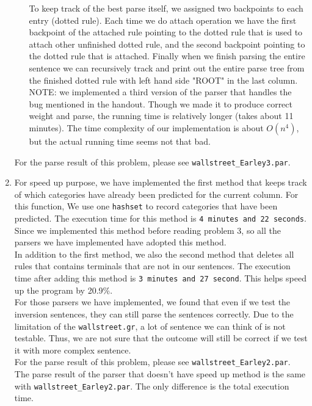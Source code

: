 \documentclass[10pt]{article}
\begin{document}
\begin{enumerate}
\begin{enumerate}
        To keep track of the best parse itself, we assigned two backpoints to each entry (dotted rule). Each time we do attach operation we have the first backpoint of the attached rule pointing to the dotted rule that is used to attach other unfinished dotted rule, and the second backpoint pointing to the dotted rule that is attached. Finally when we finish parsing the entire sentence we can recursively track and print out the entire parse tree from the finished dotted rule with left hand side "ROOT" in the last column.\\
        
        NOTE: we implemented a third version of the parser that handles the bug mentioned in the handout. Though we made it to produce correct weight and parse, the running time is relatively longer (takes about 11 minutes). The time complexity of our implementation is about $O(n^4)$, but the actual running time seems not that bad.\\
        
	\end{enumerate}
    For the parse result of this problem, please see \texttt{wallstreet\_Earley3.par}.
\item %


For speed up purpose, we have implemented the first method that keeps track of which categories have already been predicted for the current column. For this function, We use one \texttt{hashset} to record categories that have been predicted. The execution time for this method is \texttt{4 minutes and 22 seconds}. Since we implemented this method before reading problem 3, so all the parsers we have implemented have adopted this method.\\

In addition to the first method, we also the second method that deletes all rules that contains terminals that are not in our sentences. The execution time after adding this method is \texttt{3 minutes and 27 second}. This helps speed up the program by 20.9\%. \\

For those parsers we have implemented, we found that even if we test the inversion  sentences, they can still parse the sentences correctly. Due to the limitation of the \texttt{wallstreet.gr}, a lot of sentence we can think of is not testable. Thus, we are not sure that the outcome will still be correct if we test it with more complex sentence.\\

For the parse result of this problem, please see \texttt{wallstreet\_Earley2.par}. The parse result of the parser that doesn't have speed up method is the same with \texttt{wallstreet\_Earley2.par}. The only difference is the total execution time.

    
\end{enumerate}
\end{document}

